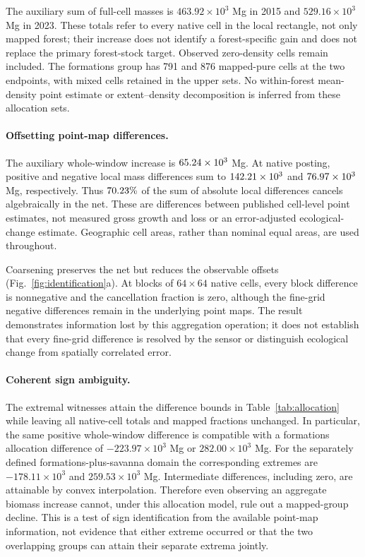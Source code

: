 \documentclass[11pt,a4paper]{article}
\begin{document}
The auxiliary sum of full-cell masses is $463.92\times10^3$ Mg in 2015 and $529.16\times10^3$ Mg in 2023. These totals refer to every native cell in the local rectangle, not only mapped forest; their increase does not identify a forest-specific gain and does not replace the primary forest-stock target. Observed zero-density cells remain included. The formations group has 791 and 876 mapped-pure cells at the two endpoints, with mixed cells retained in the upper sets. No within-forest mean-density point estimate or extent--density decomposition is inferred from these allocation sets.

\paragraph{Offsetting point-map differences.}
The auxiliary whole-window increase is $65.24\times10^3$ Mg. At native posting, positive and negative local mass differences sum to $142.21\times10^3$ and $76.97\times10^3$ Mg, respectively. Thus $70.23\%$ of the sum of absolute local differences cancels algebraically in the net. These are differences between published cell-level point estimates, not measured gross growth and loss or an error-adjusted ecological-change estimate. Geographic cell areas, rather than nominal equal areas, are used throughout.

Coarsening preserves the net but reduces the observable offsets (Fig.~\ref{fig:identification}a). At blocks of $64\times64$ native cells, every block difference is nonnegative and the cancellation fraction is zero, although the fine-grid negative differences remain in the underlying point maps. The result demonstrates information lost by this aggregation operation; it does not establish that every fine-grid difference is resolved by the sensor or distinguish ecological change from spatially correlated error.

\paragraph{Coherent sign ambiguity.}
The extremal witnesses attain the difference bounds in Table~\ref{tab:allocation} while leaving all native-cell totals and mapped fractions unchanged. In particular, the same positive whole-window difference is compatible with a formations allocation difference of $-223.97\times10^3$ Mg or $282.00\times10^3$ Mg. For the separately defined formations-plus-savanna domain the corresponding extremes are $-178.11\times10^3$ and $259.53\times10^3$ Mg. Intermediate differences, including zero, are attainable by convex interpolation. Therefore even observing an aggregate biomass increase cannot, under this allocation model, rule out a mapped-group decline. This is a test of sign identification from the available point-map information, not evidence that either extreme occurred or that the two overlapping groups can attain their separate extrema jointly.
\end{document}
